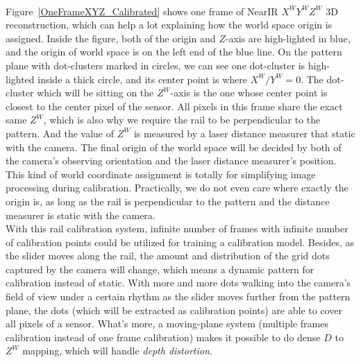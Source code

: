 %
\\\indent
Figure~\ref{OneFrameXYZ_Calibrated} shows one frame of NearIR \(X^WY^WZ^W\) 3D reconstruction, which can help a lot explaining how the world space origin is assigned. Inside the figure, both of the origin and \(Z\)-axis are high-lighted in blue, and the origin of world space is on the left end of the blue line. On the pattern plane with dot-clusters marked in circles, we can see one dot-cluster is high-lighted inside a thick circle, and its center point is where \(X^W/Y^W = 0\). The dot-cluster which will be sitting on the \(Z^W\)-axis is the one whose center point is closest to the center pixel of the sensor. All pixels in this frame share the exact same \(Z^W\), which is also why we require the rail to be perpendicular to the pattern. And the value of \(Z^W\) is measured by a laser distance measurer that static with the camera. The final origin of the world space will be decided by both of the camera's observing orientation and the laser distance measurer's position. This kind of world coordinate assignment is totally for simplifying image processing during calibration.  Practically, we do not even care where exactly the origin is, as long as the rail is perpendicular to the pattern and the distance measurer is static with the camera.
\\\indent
With this rail calibration system, infinite number of frames with infinite number of calibration points could be utilized for training a calibration model. Besides, as the slider moves along the rail, the amount and distribution of the grid dots captured by the camera will change, which means a dynamic pattern for calibration instead of static. With more and more dots walking into the camera's field of view under a certain rhythm as the slider moves further from the pattern plane, the dots (which will be extracted as calibration points) are able to cover all pixels of a sensor. What's more, a moving-plane system (multiple frames calibration instead of one frame calibration) makes it possible to do dense \(D\) to \(Z^W\) mapping, which will handle \emph{depth distortion}.


